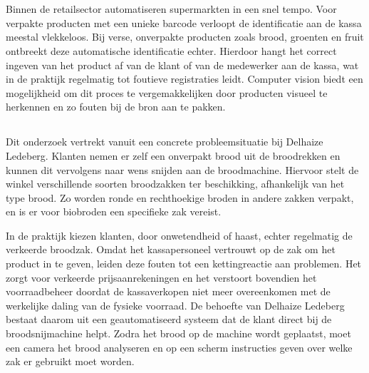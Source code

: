 

\chapter{}%
\label{ch:inleiding}

Binnen de retailsector automatiseren supermarkten in een snel tempo. Voor verpakte producten met een unieke barcode verloopt de identificatie aan de kassa meestal vlekkeloos. Bij verse, onverpakte producten zoals brood, groenten en fruit ontbreekt deze automatische identificatie echter. Hierdoor hangt het correct ingeven van het product af van de klant of van de medewerker aan de kassa, wat in de praktijk regelmatig tot foutieve registraties leidt. Computer vision biedt een mogelijkheid om dit proces te vergemakkelijken door producten visueel te herkennen en zo fouten bij de bron aan te pakken.

\section{}%
\label{sec:probleemstelling}

Dit onderzoek vertrekt vanuit een concrete probleemsituatie bij Delhaize Ledeberg. Klanten nemen er zelf een onverpakt brood uit de broodrekken en kunnen dit vervolgens naar wens snijden aan de broodmachine. Hiervoor stelt de winkel verschillende soorten broodzakken ter beschikking, afhankelijk van het type brood. Zo worden ronde en rechthoekige broden in andere zakken verpakt, en is er voor biobroden een specifieke zak vereist.

In de praktijk kiezen klanten, door onwetendheid of haast, echter regelmatig de verkeerde broodzak. Omdat het kassapersoneel vertrouwt op de zak om het product in te geven, leiden deze fouten tot een kettingreactie aan problemen. Het zorgt voor verkeerde prijsaanrekeningen en het verstoort bovendien het voorraadbeheer doordat de kassaverkopen niet meer overeenkomen met de werkelijke daling van de fysieke voorraad. De behoefte van Delhaize Ledeberg bestaat daarom uit een geautomatiseerd systeem dat de klant direct bij de broodsnijmachine helpt. Zodra het brood op de machine wordt geplaatst, moet een camera het brood analyseren en op een scherm instructies geven over welke zak er gebruikt moet worden.

